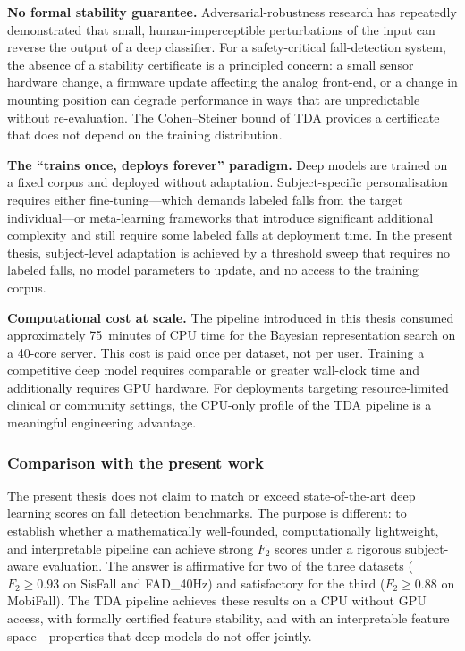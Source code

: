 \documentclass[onluarkali,ingilizce,yukseklisans,karton,LisansustuEgitim]{itutez}
\providecommand{\1}{\mathbf{1}}
\begin{document}
\textbf{No formal stability guarantee.}  Adversarial-robustness research has
repeatedly demonstrated that small, human-imperceptible perturbations of the input
can reverse the output of a deep classifier.  For a safety-critical fall-detection
system, the absence of a stability certificate is a principled concern: a small
sensor hardware change, a firmware update affecting the analog front-end, or a
change in mounting position can degrade performance in ways that are unpredictable
without re-evaluation.  The Cohen--Steiner bound of TDA provides a certificate that
does not depend on the training distribution.

\textbf{The ``trains once, deploys forever'' paradigm.}  Deep models are trained on
a fixed corpus and deployed without adaptation.  Subject-specific personalisation
requires either fine-tuning---which demands labeled falls from the target
individual---or meta-learning frameworks that introduce significant additional
complexity and still require some labeled falls at deployment time.  In the present
thesis, subject-level adaptation is achieved by a threshold sweep that requires no
labeled falls, no model parameters to update, and no access to the training corpus.

\textbf{Computational cost at scale.}  The pipeline introduced in this thesis
consumed approximately 75~minutes of CPU time for the Bayesian representation search
on a 40-core server.  This cost is paid once per dataset, not per user.
Training a competitive deep model requires comparable or greater wall-clock time
and additionally requires GPU hardware.  For deployments targeting resource-limited
clinical or community settings, the CPU-only profile of the TDA pipeline is a
meaningful engineering advantage.

\subsubsection{Comparison with the present work}

The present thesis does not claim to match or exceed state-of-the-art deep learning
scores on fall detection benchmarks.  The purpose is different: to establish whether
a mathematically well-founded, computationally lightweight, and interpretable
pipeline can achieve strong $F_2$ scores under a rigorous subject-aware evaluation.
The answer is affirmative for two of the three datasets ($F_2 \geq 0.93$ on SisFall
and FAD\_40Hz) and satisfactory for the third ($F_2 \geq 0.88$ on MobiFall).  The
TDA pipeline achieves these results on a CPU without GPU access, with formally
certified feature stability, and with an interpretable feature space---properties
that deep models do not offer jointly.
\end{document}
